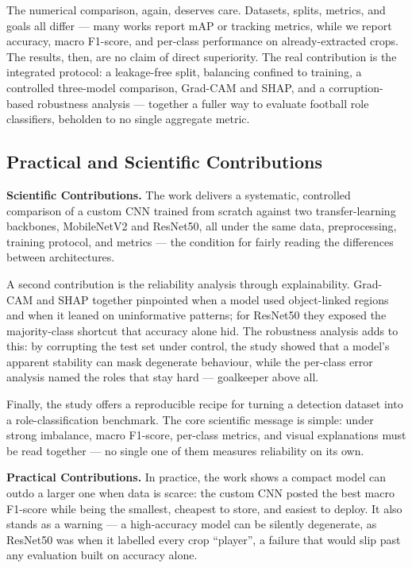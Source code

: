 \documentclass[preprint,12pt]{elsarticle}
\begin{document}
The numerical comparison, again, deserves care. Datasets, splits, metrics, and goals all differ --- many works report mAP or tracking metrics, while we report accuracy, macro F1-score, and per-class performance on already-extracted crops. The results, then, are no claim of direct superiority. The real contribution is the integrated protocol: a leakage-free split, balancing confined to training, a controlled three-model comparison, Grad-CAM and SHAP, and a corruption-based robustness analysis --- together a fuller way to evaluate football role classifiers, beholden to no single aggregate metric.

\subsection{Practical and Scientific Contributions}

\textbf{Scientific Contributions.}
The work delivers a systematic, controlled comparison of a custom CNN trained from scratch against two transfer-learning backbones, MobileNetV2 and ResNet50, all under the same data, preprocessing, training protocol, and metrics --- the condition for fairly reading the differences between architectures.

A second contribution is the reliability analysis through explainability. Grad-CAM and SHAP together pinpointed when a model used object-linked regions and when it leaned on uninformative patterns; for ResNet50 they exposed the majority-class shortcut that accuracy alone hid. The robustness analysis adds to this: by corrupting the test set under control, the study showed that a model's apparent stability can mask degenerate behaviour, while the per-class error analysis named the roles that stay hard --- goalkeeper above all.

Finally, the study offers a reproducible recipe for turning a detection dataset into a role-classification benchmark. The core scientific message is simple: under strong imbalance, macro F1-score, per-class metrics, and visual explanations must be read together --- no single one of them measures reliability on its own.

\textbf{Practical Contributions.}
In practice, the work shows a compact model can outdo a larger one when data is scarce: the custom CNN posted the best macro F1-score while being the smallest, cheapest to store, and easiest to deploy. It also stands as a warning --- a high-accuracy model can be silently degenerate, as ResNet50 was when it labelled every crop ``player'', a failure that would slip past any evaluation built on accuracy alone.
\end{document}
